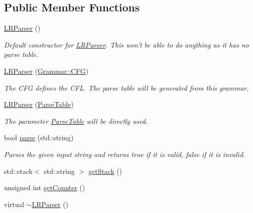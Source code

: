 \subsection*{\-Public \-Member \-Functions}
\begin{DoxyCompactItemize}
\item 
\hyperlink{classparser_1_1LRParser_a47746b2d23e724d5149a51971a92cf7e}{\-L\-R\-Parser} ()
\begin{DoxyCompactList}\small\item\em \-Default constructor for \hyperlink{classparser_1_1LRParser}{\-L\-R\-Parser}. \-This won't be able to do anything as it has no parse table. \end{DoxyCompactList}\item 
\hyperlink{classparser_1_1LRParser_a275c85831be080f6befe55be32e624ca}{\-L\-R\-Parser} (\hyperlink{classGrammar_1_1CFG}{\-Grammar\-::\-C\-F\-G})
\begin{DoxyCompactList}\small\item\em \-The \-C\-F\-G defines the \-C\-F\-L. \-The parse table will be generated from this grammar. \end{DoxyCompactList}\item 
\hyperlink{classparser_1_1LRParser_a14376046af5b5d818b6e46902d765b0d}{\-L\-R\-Parser} (\hyperlink{classparser_1_1ParseTable}{\-Parse\-Table})
\begin{DoxyCompactList}\small\item\em \-The parameter \hyperlink{classparser_1_1ParseTable}{\-Parse\-Table} will be directly used. \end{DoxyCompactList}\item 
bool \hyperlink{classparser_1_1LRParser_ab2152a22b9f4df294863ea2ecb5bea2a}{parse} (std\-::string)
\begin{DoxyCompactList}\small\item\em \-Parses the given input string and returns true if it is valid, false if it is invalid. \end{DoxyCompactList}\item 
std\-::stack$<$ std\-::string $>$ \hyperlink{classparser_1_1LRParser_afb2888c56509ee1b5252e825b48eaf60}{get\-Stack} ()
\item 
unsigned int \hyperlink{classparser_1_1LRParser_a71371a8a7881011135735d46f66aad13}{get\-Counter} ()
\item 
virtual \hyperlink{classparser_1_1LRParser_a786f8c43582c5f620fb6d9f077be2af5}{$\sim$\-L\-R\-Parser} ()
\end{DoxyCompactItemize}

